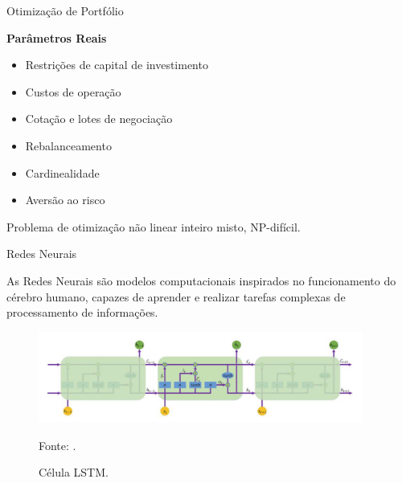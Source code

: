    \begin{frame}{Otimização de Portfólio}

        \LARGE \textbf{Parâmetros Reais}

        \begin{itemize}
            \item Restrições de capital de investimento
            \item Custos de operação
            \item Cotação e lotes de negociação
            \item Rebalanceamento
            \item Cardinealidade
            \item Aversão ao risco
        \end{itemize}

        Problema de otimização não linear inteiro misto, NP-difícil.

    \end{frame}




    \begin{frame}{Redes Neurais}

        As Redes Neurais são modelos computacionais inspirados no funcionamento do cérebro humano, capazes de aprender e realizar tarefas complexas de processamento de informações.

        \begin{figure}[htbp]
            \centering
            \caption{Célula LSTM.}
            \label{fig:lstm}
            \includegraphics[width=0.95\textwidth]{images/lstm.png}
            \par \footnotesize Fonte: \citeauthor{ta2020portfolio}.
        \end{figure}


    \end{frame}





